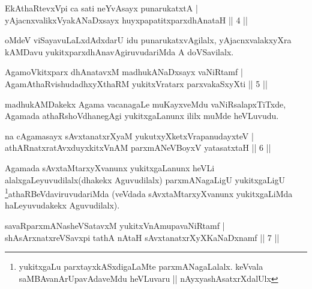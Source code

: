 
\begin{shl}
EkAthaRtevxV\s pi ca sati neYvAsayx punarukatxtA |\\
yAjacnxvalikxVyakANaDxsayx huyxpapatitxparxdhAnataH \hfill || 4 ||
\end{shl}

\begin{artha}
oMdeV viSayavuLaLxdAdxdarU idu punarukatxvAgilalx, yAjacnxvalakxyXra kAMDavu yukitxparxdhAnavAgiruvudariMda A doVSavilalx.
\end{artha}

\begin{shl}
AgamoVkitxparx dhAnatavxM madhukANaDxsayx vaNiRtamf |\\
AgamAthaRvishudadhxyXthaRM yukitxVratarx parxvakaSxyXti \hfill || 5 ||
\end{shl}

\begin{artha}
madhukAMDakekx Agama vacanagaLe muKayxveMdu vaNiRsalapxTiTxde, Agamada athaRshoVdhanegAgi yukitxgaLanunx ililx muMde heVLuvudu.
\end{artha}


\begin{shl}
na cA\s \s gamasayx sAvxtanatxrXyaM yukutxyXketxVrapanudayxteV |\\
athARnatxratAvxduyxkitxVnAM parxmANeVBoyxV yatasatxtaH \hfill || 6 ||
\end{shl}

\begin{artha}
Agamada sAvxtaMtarxyXvanunx yukitxgaLanunx heVLi alalxgaLeyuvudilalx(dhakekx Aguvudilalx) parxmANagaLigU yukitxgaLigU \footnote[1]{yukitxgaLu parxtayxkASxdigaLaMte parxmANagaLalalx. keVvala saMBAvanArUpavAdaveMdu heVLuvaru || nAyxyashAsatxrXdalUlx}athaRBeVdaviruvudariMda (veVdada sAvxtaMtarxyXvanunx yukitxgaLiMda haLeyuvudakekx Aguvudilalx).
\end{artha}


\begin{shl}
savaRparxmANasheVSatavxM yukitxVnAmupavaNiRtamf |\\
shAsArxnatxreVSavxpi tathA nAtaH sAvxtanatxrXyXKaNaDxnamf \hfill || 7 ||
\end{shl}


